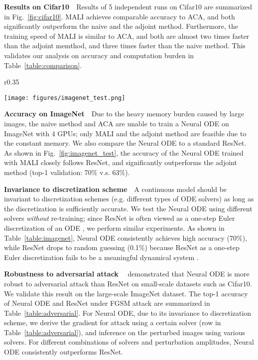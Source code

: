 \documentclass{article} \usepackage{iclr2021_conference,times}
\begin{document}
\textbf{Results on Cifar10}\ \ 
Results of 5 independent runs on Cifar10 are summarized in Fig.~\ref{fig:cifar10}. MALI achieves comparable accuracy to ACA, and both significantly outperform the naive and the adjoint method. Furthermore, the training speed of MALI is similar to ACA, and both are almost two times faster than the adjoint memthod, and three times faster than the naive method. This validates our analysis on accuracy and computation burden in Table~\ref{table:comparison}. \\
\begin{wrapfigure}{r}{0.35\textwidth}
\begin{minipage}{\linewidth}
\centering
\texttt{[image: figures/imagenet\_test.png]}
\vspace{-7mm}
\label{fig:imagenet_test}
\end{minipage}
\vspace{-6mm}
\end{wrapfigure} 
\textbf{Accuracy on ImageNet}\ \ Due to the heavy memory burden caused by large images, the naive method and ACA are unable to train a Neural ODE on ImageNet with 4 GPUs; only MALI and the adjoint method are feasible due to the constant memory. We also compare the Neural ODE to a standard ResNet. As shown in Fig.~\ref{fig:imagenet_test}, the accuracy of the Neural ODE trained with MALI closely follows ResNet, and significantly outperforms the adjoint method (top-1 validation: 70\% v.s. 63\%).

\textbf{Invariance to discretization scheme}\ \
A continuous model should be invariant to discretization schemes (e.g. different types of ODE solvers) as long as the discretization is sufficiently accurate. We test the Neural ODE using different solvers \textit{without} re-training; since ResNet is often viewed as a one-step Euler discretization of an ODE \citep{haber2017stable}, we perform similar experiments.
As shown in Table~\ref{table:imagenet}, Neural ODE consistently achieves high accuracy (70\%), while ResNet drops to random guessing (0.1\%) because ResNet as a one-step Euler discretization fails to be a meaningful dynamical system \citep{queiruga2020continuous}.

\textbf{Robustness to adversarial attack}\ \ \citet{hanshu2019robustness} demonstrated that Neural ODE is more robust to adversarial attack than ResNet on small-scale datasets such as Cifar10. We validate this result on the large-scale ImageNet dataset. The top-1 accuracy of Neural ODE and ResNet under FGSM attack \citep{goodfellow2014explaining} are summarized in Table~\ref{table:adversarial}. For Neural ODE, due to its invariance to discretization scheme, we derive the gradient for attack using a certain solver (row in Table~\ref{table:adversarial}), and inference on the perturbed images using various solvers. For different combinations of solvers and perturbation amplitudes, Neural ODE consistently outperforms ResNet.
\end{document}
